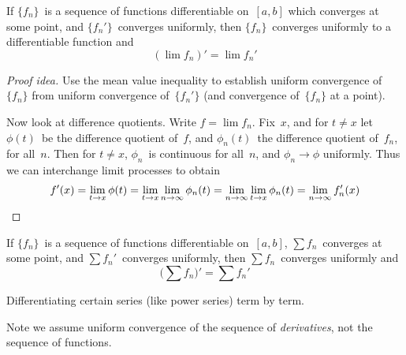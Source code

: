 \begin{thm}
If \(\{f_n\}\)~is a sequence of functions differentiable on~\([a,b]\) which converges at some point, and \(\{f_n'\}\)~converges uniformly, then \(\{f_n\}\)~converges uniformly to a differentiable function and
\[(\lim f_n)'=\lim f_n'\]
\end{thm}
\begin{proof}[Proof idea]
Use the mean value inequality to establish uniform convergence of~\(\{f_n\}\) from uniform convergence of~\(\{f_n'\}\) (and convergence of~\(\{f_n\}\) at a point).

Now look at difference quotients. Write \(f=\lim f_n\). Fix~\(x\), and for \(t\ne x\) let \(\phi(t)\)~be the difference quotient of~\(f\), and \(\phi_n(t)\)~the difference quotient of~\(f_n\), for all~\(n\). Then for \(t\ne x\), \(\phi_n\)~is continuous for all~\(n\), and \(\phi_n\to\phi\) uniformly. Thus we can interchange limit processes to obtain
\begin{equation*}
f'(x)=\lim_{t\to x}\phi(t)=\lim_{t\to x}\lim_{n\to\infty}\phi_n(t)=\lim_{n\to\infty}\lim_{t\to x}\phi_n(t)=\lim_{n\to\infty}f_n'(x)\qedhere
\end{equation*}
\end{proof}
\begin{cor}
If \(\{f_n\}\)~is a sequence of functions differentiable on~\([a,b]\), \(\sum f_n\)~converges at some point, and \(\sum f_n'\)~converges uniformly, then \(\sum f_n\)~converges uniformly and
\[\bigl(\sum f_n\bigr)'=\sum f_n'\]
\end{cor}
\begin{app}
Differentiating certain series (like power series) term by term.
\end{app}
\begin{rmk}
Note we assume uniform convergence of the sequence of \emph{derivatives}, not the sequence of functions.
\end{rmk}

